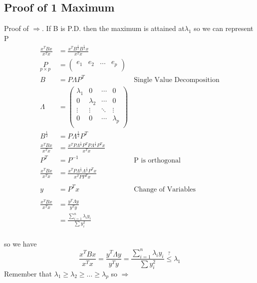 \subsection{Proof of 1 Maximum}
Proof of $\Rightarrow$. If B is P.D. then the maximum is attained at$\lambda_1$ so we can represent P
\begin{align*}
    \frac{x^TBx}{x^Tx} &= \frac{x^TB^{\frac{1}{2}}B^{\frac{1}{2}}x}{x^Tx} \\
    \underset{p \times p}{P} &= \begin{pmatrix}
    e_1 & e_2 & ...& e_p \\
    \end{pmatrix}\\
     B &= P \Lambda P^T \quad &\text{Single Value Decomposition}\\
     \Lambda &= \begin{pmatrix}
    \lambda_1 & 0 & \cdots & 0 \\
    0 & \lambda_2 & \cdots & 0 \\
    \vdots & \vdots & \ddots & \vdots \\
    0 & 0 & \cdots & \lambda_p \\
    \end{pmatrix}\\
    B^{\frac{1}{2}} &= P\Lambda^{\frac{1}{2}}P^T \\
    \frac{x^TBx}{x^Tx} &= \frac{x^TP\Lambda^{\frac{1}{2}}P^TP\Lambda^{\frac{1}{2}}P^Tx}{x^Tx} \\
    P^T &= P^{-1} &\text{P is orthogonal}\\
    \frac{x^TBx}{x^Tx} &= \frac{x^TP\Lambda^{\frac{1}{2}}\Lambda^{\frac{1}{2}}P^Tx}{x^TPP^Tx}\\ \\
    y &=P^Tx &\text{Change of Variables}\\ \\
    \frac{x^TBx}{x^Tx} &= \frac{y^T\Lambda y}{y^Ty}\\
    &= \frac{\displaystyle\sum_{i=1}^{n} \lambda_i y_i}{\sum{y_i^2}} \\
\end{align*}

so we have 
\begin{equation*}
    \frac{x^TBx}{x^Tx} =
    \frac{y^T\Lambda y}{y^Ty} = 
    \frac{\displaystyle\sum_{i=1}^{n} \lambda_i y_i}{\sum{y_i^2}} \overset{?}{\leq} \lambda_1
\end{equation*}
Remember that $\lambda_1 \geq \lambda_2 \geq ... \geq \lambda_p$ so $\Rightarrow$

